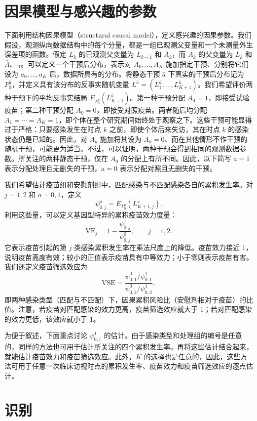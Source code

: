 \section{因果模型与感兴趣的参数}

下面利用结构因果模型（structural causal model），定义感兴趣的因果参数。我们假设，观测纵向数据结构中的每个分量，都是一组已观测父变量和一个未测量外生误差项的函数。假定 $L_k$ 的已观测父变量为 $\bar L_{k-1}$ 和 $\bar A_k$，而 $A_k$ 的父变量为 $\bar L_k$ 和 $\bar A_{k-1}$。可以定义一个干预后分布，表示对 $A_0,\ldots,A_K$ 施加指定干预、分别将它们设为 $a_0,\ldots,a_K$ 后，数据所具有的分布。将静态干预 $\bar a$ 下真实的干预后分布记为 $P_0^{\bar a}$，并定义具有该分布的反事实随机变量 $L^{\bar a}=(L_1^{\bar a},\ldots,L_{K+1}^{\bar a})$。我们希望评价两种干预下的平均反事实结局 $E_{P_0^{\bar a}}(L_{K+1}^{\bar a})$。第一种干预分配 $A_0=1$，即接受试验疫苗；第二种干预分配 $A_0=0$，即接受对照疫苗。两者随后均分配 $A_1=\cdots=A_K=1$，即个体在整个研究期间始终处于观察之下。这些干预可能显得过于严格：只要感染发生在时点 $k$ 之前，即使个体后来失访，其在时点 $k$ 的感染状态仍是已知的。因此，对 $A_k$ 施加将其设为 $A_k=0$、而在其他情形不作干预的随机干预，可能更为适当。不过，可以证明，两种干预会得到相同的观测数据参数。所关注的两种静态干预，仅在 $A_0$ 的分配上有所不同。因此，以下简写 $a=1$ 表示分配处理且无删失的干预，$a=0$ 表示分配对照且无删失的干预。

我们希望估计疫苗组和安慰剂组中，匹配感染与不匹配感染各自的累积发生率。对 $j=1,2$ 和 $a=0,1$，定义
\[
 \psi_{0,j}^a=E_{P_0^a}(L_{K+1,j}^a).
\]
利用这些量，可以定义基因型特异的累积疫苗效力度量：
\[
 \mathrm{VE}_j=1-\frac{\psi_{0,j}^1}{\psi_{0,j}^0},\qquad j=1,2.
\]
它表示疫苗引起的第 $j$ 类感染累积发生率在乘法尺度上的降低。疫苗效力接近 1，说明疫苗高度有效；较小的正值表示疫苗具有中等效力；小于零则表示疫苗有害。我们还定义疫苗筛选效应为
\[
 \mathrm{VSE}=
 \frac{\psi_{0,1}^0/\psi_{0,1}^1}{\psi_{0,2}^0/\psi_{0,2}^1},
\]
即两种感染类型（匹配与不匹配）下，因果累积风险比（安慰剂相对于疫苗）的比值。注意，若疫苗对匹配感染的效力更高，疫苗筛选效应就大于 1；若对匹配感染的效力更低，该效应就小于 1。

为便于叙述，下面重点讨论 $\psi_{0,1}^1$ 的估计。由于感染类型和处理组的编号是任意的，同样的方法也可用于估计所关注的四个累积发生率。再将这些估计结合起来，就能估计疫苗效力和疫苗筛选效应。此外，$K$ 的选择也是任意的，因此，这些方法可用于任意一次临床访视时点的累积发生率、疫苗效力和疫苗筛选效应的逐点估计。

\section{识别}

